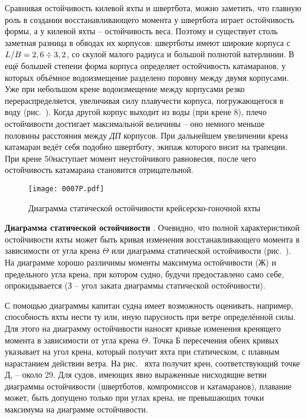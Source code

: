 Сравнивая остойчивость килевой яхты и швертбота, можно заметить, что
главную роль в создании восстанавливающего момента у швертбота играет
остойчивость формы, а у килевой яхты \--- остойчивость веса. Поэтому и
существует столь заметная разница в обводах их корпусов: швертботы
имеют широкие корпуса с $L/B = 2,6 \div 3,2$, со скулой малого
радиуса и большой полнотой ватерлинии. В ещё большей степени форма
корпуса определяет остойчивость катамаранов, у которых объёмное
водоизмещение разделено поровну между двумя корпусами. Уже при
небольшом крене водоизмещение между корпусами резко
перераспределяется, увеличивая силу плавучести корпуса, погружающегося
в воду (рис.~). Когда другой корпус выходит из воды (при крене
8\gr), плечо остойчивости достигает максимальной величины \---
оно немного меньше половины расстояния между \textit{ДП} корпусов. При
дальнейшем увеличении крена катамаран ведёт себя подобно швертботу,
экипаж которого висит на трапеции. При крене 50\gr наступает
момент неустойчивого равновесия, после чего остойчивость катамарана
становится отрицательной.

\begin{figure*}[htb]
  \centering
  \texttt{[image: 0007P.pdf]}
  \caption{Диаграмма статической остойчивости крейсерско-гоночной яхты}
  \label{fig:7}
\end{figure*}

\textbf{Диаграмма статической остойчивости}
.
Очевидно, что полной характеристикой остойчивости
яхты может быть кривая изменения восстанавливающего момента
 в зависимости от угла крена $\Theta$ или диаграмма
статической остойчивости (рис.~). На диаграмме хорошо различимы
моменты максимума остойчивости (Ж) и предельного угла крена, при
котором судно, будучи предоставлено само себе, опрокидывается (З \---
угол заката диаграммы статической остойчивости).

С помощью диаграммы капитан судна имеет возможность оценивать,
например, способность яхты нести ту или, иную парусность при ветре
определённой силы. Для этого на диаграмму остойчивости наносят кривые
изменения кренящего момента  в зависимости от угла крена
$\Theta$. Точка Б пересечения обеих кривых указывает на угол крена,
который получит яхта при статическом, с плавным нарастанием действии
ветра. На рис.~ яхта получит крен, соответствующий точке Д,
\--- около 29\gr. Для судов, имеющих явно выраженные нисходящие ветви
диаграммы остойчивости (швертботов, компромиссов и катамаранов),
плавание может, быть допущено только при углах крена, не превышающих
точки максимума на диаграмме остойчивости.

